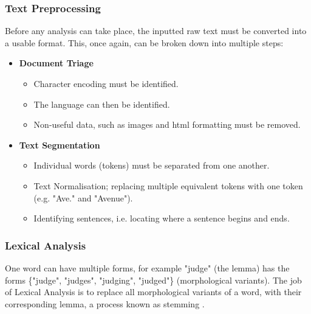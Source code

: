 \documentclass[twocolumn]{article}
\begin{document}
\subsubsection{Text Preprocessing}
\label{sec:TextPreprocessing}
Before any analysis can take place, the inputted raw text must be converted into a usable format. This, once again, can be broken down into multiple steps\cite{NLPHandbook}:
\begin{itemize}
	\item \textbf{Document Triage}

	\begin{itemize}
		\item Character encoding must be identified.
		\item The language can then be identified. %
		\item Non-useful data, such as images and html formatting must be removed.
	\end{itemize}
	
	\item \textbf{Text Segmentation}
	
	\begin{itemize}
		\item Individual words (tokens) must be separated from one another. %
		\item Text Normalisation; replacing multiple equivalent tokens with one token (e.g. "Ave." and "Avenue").
		\item Identifying sentences, i.e. locating where a sentence begins and ends. 
	\end{itemize}
	
\end{itemize} 


\subsubsection{Lexical Analysis}
\label{sec:LexicalAnalysis}
One word can have multiple forms, for example "judge" (the lemma) has the forms \{"judge", "judges", "judging", "judged"\} (morphological variants).  The job of Lexical Analysis is to replace all morphological variants of a word, with their corresponding lemma, a process known as stemming \cite{NLPHandbook}.
\end{document}
